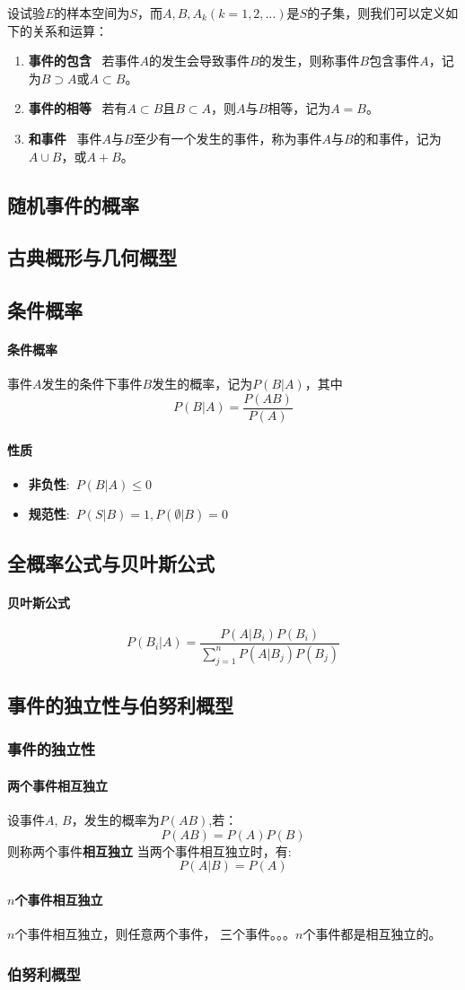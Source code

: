 \documentclass[UTF8]{ctexart}
\begin{document}
		设试验$E$的样本空间为$S$，而$A,B,A_k(k=1,2,\dots)$是$S$的子集，则我们可以定义如下的关系和运算：
		\begin{enumerate}
			\item \textbf{事件的包含} \ 若事件$A$的发生会导致事件$B$的发生，则称事件$B$包含事件$A$，记为$B \supset A$或$A \subset B$。
			\item \textbf{事件的相等} \ 若有$A \subset B$且$B \subset A$，则$A$与$B$相等，记为$A = B$。
			\item \textbf{和事件} \ 事件$A$与$B$至少有一个发生的事件，称为事件$A$与$B$的和事件，记为$A \cup B$，或$A + B$。
 		\end{enumerate}
		\subsection{随机事件的概率}
		\subsection{古典概形与几何概型}
		\subsection{条件概率}
		\paragraph{条件概率}事件$A$发生的条件下事件$B$发生的概率，记为$P(B|A)$，其中
		\[P(B|A) = \frac{P(AB)}{P(A)}\]
		\paragraph{性质}
		\begin{itemize}
			\item \textbf{非负性}:\ $P(B|A)\le 0$
			\item \textbf{规范性}:\ $P(S|B)=1,P(\emptyset|B)=0$
		\end{itemize}
		\subsection{全概率公式与贝叶斯公式}
		\paragraph{贝叶斯公式}
		\[P(B_i|A)=\frac{P(A|B_i)P(B_i)}{\sum^n_{j=1}P(A|B_j)P(B_j)}\]
		\subsection{事件的独立性与伯努利概型}
		\subsubsection{事件的独立性}
			\paragraph{两个事件相互独立}设事件$A$, $B$，发生的概率为$P(AB)$,若：
			\[P(AB)=P(A)P(B)\]
			则称两个事件\textbf{相互独立}
			当两个事件相互独立时，有:
			\[P(A|B) = P(A)\]
			\paragraph{$n$个事件相互独立}$n$个事件相互独立，则任意两个事件， 三个事件。。。$n$个事件都是相互独立的。
		\subsubsection{伯努利概型}
		
\end{document}
